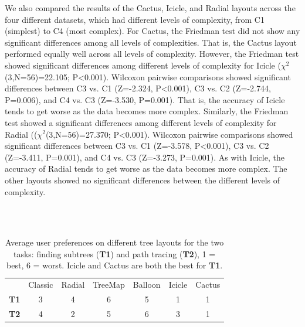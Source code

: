\documentclass[a4paper]{llncs}
\begin{document}
We also compared the results of the Cactus, Icicle, and Radial layouts across the four different datasets, which had different levels of complexity, from C1 (simplest) to C4 (most complex). For Cactus, the Friedman test did not show any significant differences among all levels of complexities. That is, the Cactus layout performed equally well across all levels of complexity. However, the Friedman test showed significant differences among different levels of complexity for Icicle ($\chi^2$(3,N=56)=22.105; P\textless0.001). Wilcoxon pairwise comparisons showed significant differences between C3 vs. C1 (Z=-2.324, P<0.001), C3 vs. C2 (Z=-2.744, P=0.006), and C4 vs. C3 (Z=-3.530, P=0.001). That is, the accuracy of Icicle  tends to get worse as the data becomes more complex.
Similarly, the Friedman test showed a significant differences among different levels of complexity for Radial (($\chi^2$(3,N=56)=27.370; P\textless0.001). Wilcoxon pairwise comparisons showed significant differences between C3 vs. C1 (Z=-3.578, P\textless0.001), C3 vs. C2 (Z=-3.411, P=0.001), and C4 vs. C3 (Z=-3.273, P=0.001). As with Icicle, the accuracy of Radial tends to get worse as the data becomes more complex. The other layouts showed no significant differences between the different levels of complexity. 


\ \\ \

\renewcommand{\arraystretch}{1}%
\begin{table}[htb]
     \begin{center}
     \begin{tabular}{ l c c c c c c }
     \toprule
 
    & Classic & Radial & TreeMap 
 & Balloon & Icicle & Cactus
 \\ 
   \cmidrule(lr){2-2}\cmidrule(l){3-3}\cmidrule(l){4-4}\cmidrule(l){5-5}\cmidrule(l){6-6}\cmidrule(l){7-7}
   \textbf{T1} & 3 & 4 & 6 & 5 & 1 &1
\\     
    \textbf{T2} & 4 & 2 & 5 & 6 & 3 &1

    \\ \bottomrule
      \end{tabular}
            
      \caption{Average user preferences on different tree layouts for the two tasks: finding subtrees (\textbf{T1}) and path tracing (\textbf{T2}), 1 = best, 6 = worst. Icicle and Cactus are both the best for \textbf{T1}.}
      \label{table: tree rating}
      \end{center}
\end{table}
\end{document}
